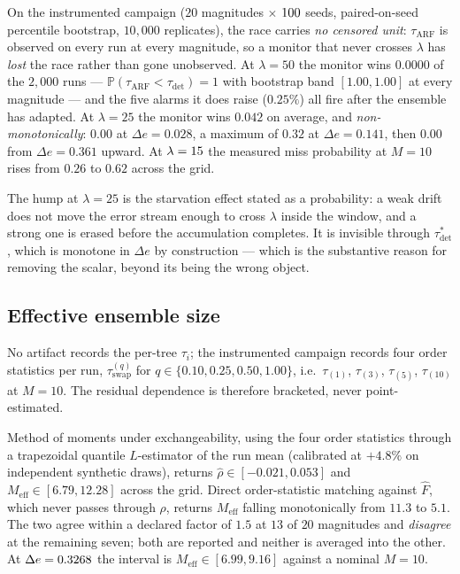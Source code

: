 \begin{empresult}\label{res:cif}
  On the instrumented campaign ($20$ magnitudes $\times$ $100$ seeds, paired-on-seed
  percentile bootstrap, $10{,}000$ replicates), the race carries \emph{no censored unit}:
  $\tau_{\mathrm{ARF}}$ is observed on every run at every magnitude, so a monitor that never crosses
  $\lambda$ has \emph{lost} the race rather than gone unobserved. At $\lambda = 50$ the monitor
  wins $0.0000$ of the $2{,}000$ runs --- $\mathbb{P}(\tau_{\mathrm{ARF}} < \tau_{\mathrm{det}}) = 1$
  with bootstrap band $[1.00, 1.00]$ at every magnitude --- and the five alarms it does raise
  ($0.25\%$) all fire after the ensemble has adapted. At $\lambda = 25$ the monitor wins $0.042$ on
  average, and \emph{non-monotonically}: $0.00$ at $\Delta e = 0.028$, a maximum of $0.32$ at
  $\Delta e = 0.141$, then $0.00$ from $\Delta e = 0.361$ upward. At $\lambda = 15$ the
  measured miss probability at $M = 10$ rises from $0.26$ to $0.62$ across the grid.
\end{empresult}

The hump at $\lambda = 25$ is the starvation effect stated as a probability: a weak drift does not
move the error stream enough to cross $\lambda$ inside the window, and a strong one is erased before
the accumulation completes. It is invisible through $\tau_{\mathrm{det}}^*$, which is monotone in
$\Delta e$ by construction --- which is the substantive reason for removing the scalar, beyond its
being the wrong object.

\subsection{Effective ensemble size}\label{sec:dep_meff}

No artifact records the per-tree $\tau_i$; the instrumented campaign records four order statistics
per run, $\tau_{\mathrm{swap}}^{(q)}$ for $q \in \{0.10, 0.25, 0.50, 1.00\}$, i.e.\ $\tau_{(1)}$,
$\tau_{(3)}$, $\tau_{(5)}$, $\tau_{(10)}$ at $M = 10$. The residual dependence is therefore
bracketed, never point-estimated.

\begin{empresult}\label{res:meff}
  Method of moments under exchangeability, using the four order statistics through a trapezoidal
  quantile $L$-estimator of the run mean (calibrated at $+4.8\%$ on independent synthetic draws),
  returns $\widehat{\rho} \in [-0.021, 0.053]$ and $M_{\mathrm{eff}} \in [6.79, 12.28]$ across the grid.
  Direct order-statistic matching against $\widehat{F}$, which never passes through $\rho$, returns
  $M_{\mathrm{eff}}$ falling monotonically from $11.3$ to $5.1$. The two agree within a declared
  factor of $1.5$ at $13$ of $20$ magnitudes and \emph{disagree} at the remaining seven; both are
  reported and neither is averaged into the other. At $\Delta e = 0.3268$ the interval is
  $M_{\mathrm{eff}} \in [6.99, 9.16]$ against a nominal $M = 10$.
\end{empresult}

